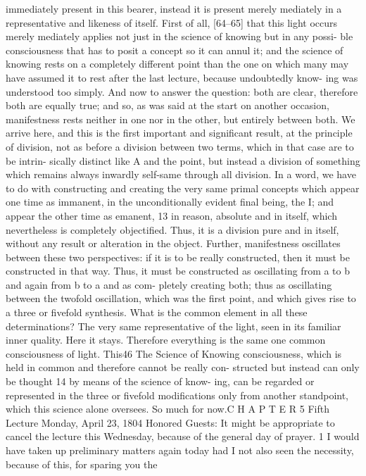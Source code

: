immediately present in this bearer, instead it is present merely mediately in a
representative and likeness of itself. First of all, [64–65] that this light occurs
merely mediately applies not just in the science of knowing but in any possi-
ble consciousness that has to posit a concept so it can annul it; and the science
of knowing rests on a completely different point than the one on which many
may have assumed it to rest after the last lecture, because undoubtedly know-
ing was understood too simply.
And now to answer the question: both are clear, therefore both are
equally true; and so, as was said at the start on another occasion, manifestness
rests neither in one nor in the other, but entirely between both. We arrive here,
and this is the first important and significant result, at the principle of division,
not as before a division between two terms, which in that case are to be intrin-
sically distinct like A and the point, but instead a division of something which
remains always inwardly self-same through all division. In a word, we have to
do with constructing and creating the very same primal concepts which
appear one time as immanent, in the unconditionally evident final being, the
I; and appear the other time as emanent, 13 in reason, absolute and in itself,
which nevertheless is completely objectified. Thus, it is a division pure and in
itself, without any result or alteration in the object.
Further, manifestness oscillates between these two perspectives: if it is
to be really constructed, then it must be constructed in that way. Thus, it must
be constructed as oscillating from a to b and again from b to a and as com-
pletely creating both; thus as oscillating between the twofold oscillation,
which was the first point, and which gives rise to a three or fivefold synthesis.
What is the common element in all these determinations? The very
same representative of the light, seen in its familiar inner quality. Here it stays.
Therefore everything is the same one common consciousness of light. This46
The Science of Knowing
consciousness, which is held in common and therefore cannot be really con-
structed but instead can only be thought 14 by means of the science of know-
ing, can be regarded or represented in the three or fivefold modifications only
from another standpoint, which this science alone oversees.
So much for now.C H A P T E R
5
Fifth Lecture
Monday, April 23, 1804
Honored Guests:
It might be appropriate to cancel the lecture this Wednesday, because of the
general day of prayer. 1 I would have taken up preliminary matters again
today had I not also seen the necessity, because of this, for sparing you the

